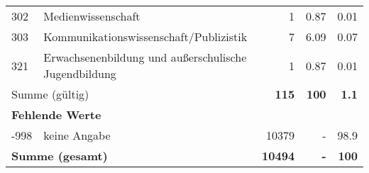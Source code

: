 \begin{longtable}{lXrrr}
        302 & \multicolumn{1}{X}{Medienwissenschaft} & %
          \num{1} &
          \num[round-mode=places,round-precision=2]{0,87} &
          \num[round-mode=places,round-precision=2]{0,01} \\

        303 & \multicolumn{1}{X}{Kommunikationswissenschaft/Publizistik} & %
          \num{7} &
          \num[round-mode=places,round-precision=2]{6,09} &
          \num[round-mode=places,round-precision=2]{0,07} \\

        321 & \multicolumn{1}{X}{Erwachsenenbildung und außerschulische Jugendbildung} & %
          \num{1} &
          \num[round-mode=places,round-precision=2]{0,87} &
          \num[round-mode=places,round-precision=2]{0,01} \\

     \midrule
     \multicolumn{2}{l}{Summe (gültig)} &
       \textbf{\num{115}} &
     \textbf{100} &
       \textbf{\num[round-mode=places,round-precision=2]{1,1}} \\
     \multicolumn{5}{l}{\textbf{Fehlende Werte}}\\
       -998 &
       keine Angabe &
         \num{10379} &
        - &
         \num[round-mode=places,round-precision=2]{98,9} \\
     \midrule
     \multicolumn{2}{l}{\textbf{Summe (gesamt)}} &
          \textbf{\num{10494}} &
        \textbf{-} &
        \textbf{100} \\
     \bottomrule
     \end{longtable}
     
